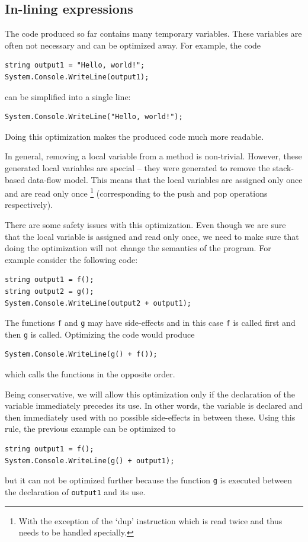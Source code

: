 \documentclass[12pt,twoside,notitlepage]{report}
\begin{document}
\subsection{In-lining expressions}

The code produced so far contains many temporary variables.
These variables are often not necessary and can be 
optimized away.  For example, the code

\begin{verbatim}
string output1 = "Hello, world!";
System.Console.WriteLine(output1);
\end{verbatim}

can be simplified into a single line:

\begin{verbatim}
System.Console.WriteLine("Hello, world!");
\end{verbatim}

Doing this optimization makes the produced code much more readable.

In general, removing a local variable from a method is non-trivial.
However, these generated local variables are special -- they were generated
to remove the stack-based data-flow model.
This means that the local variables are assigned only once and are
read only once%
\footnote{With the exception of the `dup' instruction which is read twice
and thus needs to be handled specially.}
(corresponding to the push and pop operations respectively).

There are some safety issues with this optimization.
Even though we are sure that the local variable is assigned and read
only once, we need to make sure that doing the optimization will not
change the semantics of the program.  For example consider the 
following code:

\begin{verbatim}
string output1 = f();
string output2 = g();
System.Console.WriteLine(output2 + output1);
\end{verbatim}

The functions \verb|f| and \verb|g| may have side-effects and in this 
case \verb|f| is called first and then \verb|g| is called.
Optimizing the code would produce 
\begin{verbatim}
System.Console.WriteLine(g() + f());
\end{verbatim}
which calls the functions in the opposite order.

Being conservative, we will allow this optimization only if the
declaration of the variable immediately precedes its use.
In other words, the variable is declared and then immediately
used with no possible side-effects in between these.
Using this rule, the previous example can be optimized to
\begin{verbatim}
string output1 = f();
System.Console.WriteLine(g() + output1);
\end{verbatim}
but it can not be optimized further because the function 
\verb|g| is executed between the declaration of \verb|output1|
and its use.
\end{document}
